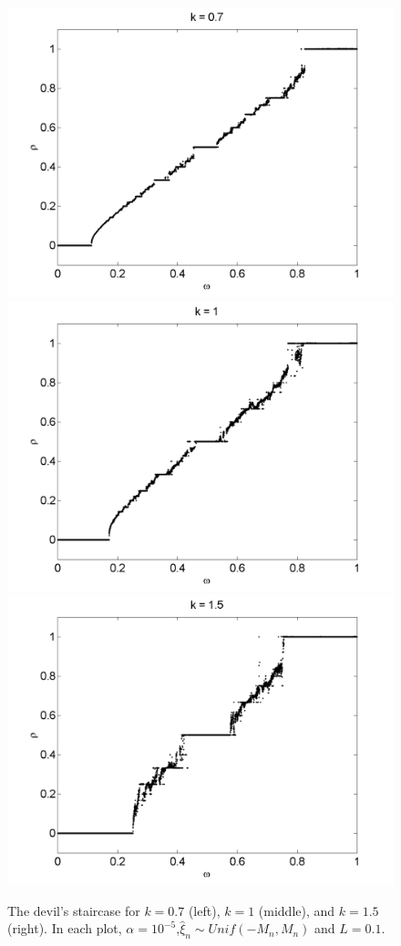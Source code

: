\begin{figure}[H]\linespread{1}
\caption[The devil's staircase for the random circle map, varying $k$ (uniform distribution)]{The devil's
  staircase for $k=0.7$ (left), $k=1$ (middle), and $k=1.5$
  (right). In each plot, $\alpha = 10^{-5}$,$\hat{\xi}_n\sim Unif(-M_n,M_n)$ and $L = 0.1$.}\label{fig:randdevil2}
\centering
\includegraphics[width=.329\textwidth]{figs/rcirc_u_devil_k07_L01.png}\hfill
\includegraphics[width=.329\textwidth]{figs/rcirc_u_devil_k1_L01.png}\hfill
\includegraphics[width=.329\textwidth]{figs/rcirc_u_devil_k15_L01.png}
\end{figure}


